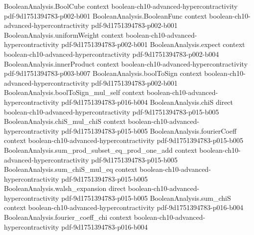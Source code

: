 \begin{theorem}
\label{BooleanAnalysis.Hypercontractivity.bridging_hypercontractivity}
\leanok
{}
\proofstep
  {BooleanAnalysis.BoolCube}
  {context}
  {boolean-ch10-advanced-hypercontractivity}
  {pdf-9d1751394783-p002-b001}
\proofstep
  {BooleanAnalysis.BooleanFunc}
  {context}
  {boolean-ch10-advanced-hypercontractivity}
  {pdf-9d1751394783-p002-b001}
\proofstep
  {BooleanAnalysis.uniformWeight}
  {context}
  {boolean-ch10-advanced-hypercontractivity}
  {pdf-9d1751394783-p002-b001}
\proofstep
  {BooleanAnalysis.expect}
  {context}
  {boolean-ch10-advanced-hypercontractivity}
  {pdf-9d1751394783-p002-b004}
\proofstep
  {BooleanAnalysis.innerProduct}
  {context}
  {boolean-ch10-advanced-hypercontractivity}
  {pdf-9d1751394783-p003-b007}
\proofstep
  {BooleanAnalysis.boolToSign}
  {context}
  {boolean-ch10-advanced-hypercontractivity}
  {pdf-9d1751394783-p002-b001}
\proofstep
  {BooleanAnalysis.boolToSign_mul_self}
  {context}
  {boolean-ch10-advanced-hypercontractivity}
  {pdf-9d1751394783-p016-b004}
\proofstep
  {BooleanAnalysis.chiS}
  {direct}
  {boolean-ch10-advanced-hypercontractivity}
  {pdf-9d1751394783-p015-b005}
\proofstep
  {BooleanAnalysis.chiS_mul_chiS}
  {context}
  {boolean-ch10-advanced-hypercontractivity}
  {pdf-9d1751394783-p015-b005}
\proofstep
  {BooleanAnalysis.fourierCoeff}
  {context}
  {boolean-ch10-advanced-hypercontractivity}
  {pdf-9d1751394783-p015-b005}
\proofstep
  {BooleanAnalysis.sum_prod_subset_eq_prod_one_add}
  {context}
  {boolean-ch10-advanced-hypercontractivity}
  {pdf-9d1751394783-p015-b005}
\proofstep
  {BooleanAnalysis.sum_chiS_mul_eq}
  {context}
  {boolean-ch10-advanced-hypercontractivity}
  {pdf-9d1751394783-p015-b005}
\proofstep
  {BooleanAnalysis.walsh_expansion}
  {direct}
  {boolean-ch10-advanced-hypercontractivity}
  {pdf-9d1751394783-p015-b005}
\proofstep
  {BooleanAnalysis.sum_chiS}
  {context}
  {boolean-ch10-advanced-hypercontractivity}
  {pdf-9d1751394783-p016-b004}
\proofstep
  {BooleanAnalysis.fourier_coeff_chi}
  {context}
  {boolean-ch10-advanced-hypercontractivity}
  {pdf-9d1751394783-p016-b004}
\proofstep

\end{theorem}
